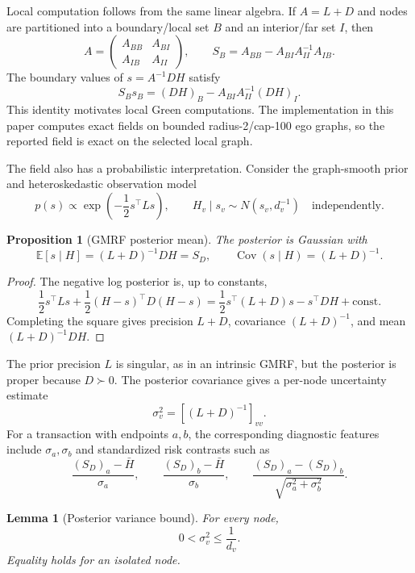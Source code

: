 \documentclass[11pt]{article}
\newtheorem{proposition}[theorem]{Proposition}
\newtheorem{lemma}[theorem]{Lemma}
\theoremstyle{definition}
\theoremstyle{remark}
\newcommand{\E}{\mathbb{E}}
\newcommand{\Cov}{\operatorname{Cov}}
\newcommand{\SD}{S_D}
\begin{document}
Local computation follows from the same linear algebra. If $A=L+D$ and nodes are partitioned into a boundary/local set $B$ and an interior/far set $I$, then
\[
    A=\begin{pmatrix}A_{BB}&A_{BI}\\ A_{IB}&A_{II}\end{pmatrix},
    \qquad
    S_B=A_{BB}-A_{BI}A_{II}^{-1}A_{IB}.
\]
The boundary values of $s=A^{-1}DH$ satisfy
\[
    S_Bs_B=(DH)_B-A_{BI}A_{II}^{-1}(DH)_I.
\]
This identity motivates local Green computations. The implementation in this paper computes exact fields on bounded radius-2/cap-100 ego graphs, so the reported field is exact on the selected local graph.

The field also has a probabilistic interpretation. Consider the graph-smooth prior and heteroskedastic observation model
\[
    p(s)\propto \exp\left(-\frac12s^\top Ls\right),
    \qquad
    H_v\mid s_v\sim N(s_v,d_v^{-1})\quad\text{independently}.
\]

\begin{proposition}[GMRF posterior mean]
The posterior is Gaussian with
\[
    \E[s\mid H]=(L+D)^{-1}DH=\SD,
    \qquad
    \Cov(s\mid H)=(L+D)^{-1}.
\]
\end{proposition}

\begin{proof}
The negative log posterior is, up to constants,
\[
    \frac12s^\top Ls+\frac12(H-s)^\top D(H-s)
    =\frac12s^\top(L+D)s-s^\top DH+\text{const.}
\]
Completing the square gives precision $L+D$, covariance $(L+D)^{-1}$, and mean $(L+D)^{-1}DH$.
\end{proof}

The prior precision $L$ is singular, as in an intrinsic GMRF, but the posterior is proper because $D\succ0$. The posterior covariance gives a per-node uncertainty estimate
\begin{equation}
    \sigma_v^2=[(L+D)^{-1}]_{vv}.
    \label{eq:posterior-var}
\end{equation}
For a transaction with endpoints $a,b$, the corresponding diagnostic features include $\sigma_a,\sigma_b$ and standardized risk contrasts such as
\[
    \frac{(\SD)_a-\bar H}{\sigma_a},
    \qquad
    \frac{(\SD)_b-\bar H}{\sigma_b},
    \qquad
    \frac{(\SD)_a-(\SD)_b}{\sqrt{\sigma_a^2+\sigma_b^2}}.
\]

\begin{lemma}[Posterior variance bound]
For every node,
\[
    0<\sigma_v^2\le \frac1{d_v}.
\]
Equality holds for an isolated node.
\end{lemma}
\end{document}
